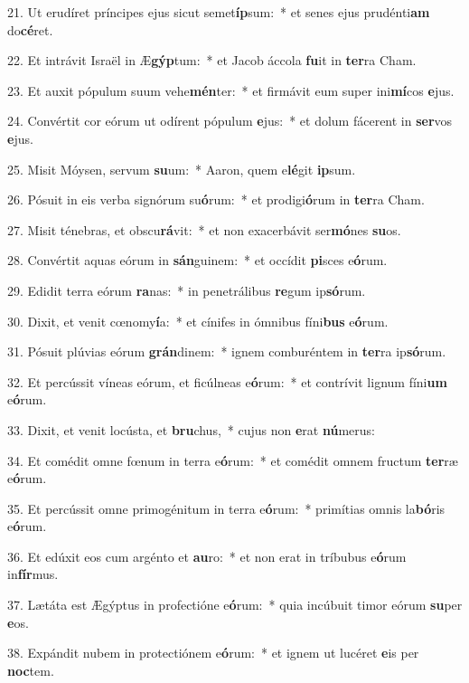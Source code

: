 21. Ut erudíret príncipes ejus sicut semet\textbf{íp}sum:~*  et senes ejus prudénti\textbf{am} do\textbf{cé}ret.\

22. Et intrávit Israël in Æ\textbf{gýp}tum:~*  et Jacob áccola \textbf{fu}it in \textbf{ter}ra Cham.\

23. Et auxit pópulum suum vehe\textbf{mén}ter:~*  et firmávit eum super ini\textbf{mí}cos \textbf{e}jus.\

24. Convértit cor eórum ut odírent pópulum \textbf{e}jus:~*  et dolum fácerent in \textbf{ser}vos \textbf{e}jus.\

25. Misit Móysen, servum \textbf{su}um:~*  Aaron, quem e\textbf{lé}git \textbf{ip}sum.\

26. Pósuit in eis verba signórum su\textbf{ó}rum:~*  et prodigi\textbf{ó}rum in \textbf{ter}ra Cham.\

27. Misit ténebras, et obscu\textbf{rá}vit:~*  et non exacerbávit ser\textbf{mó}nes \textbf{su}os.\

28. Convértit aquas eórum in \textbf{sán}guinem:~*  et occídit \textbf{pi}sces e\textbf{ó}rum.\

29. Edidit terra eórum \textbf{ra}nas:~*  in penetrálibus \textbf{re}gum ip\textbf{só}rum.\

30. Dixit, et venit cœnomy\textbf{í}a:~*  et cínifes in ómnibus fíni\textbf{bus} e\textbf{ó}rum.\

31. Pósuit plúvias eórum \textbf{grán}dinem:~*  ignem comburéntem in \textbf{ter}ra ip\textbf{só}rum.\

32. Et percússit víneas eórum, et ficúlneas e\textbf{ó}rum:~*  et contrívit lignum fíni\textbf{um} e\textbf{ó}rum.\

33. Dixit, et venit locústa, et \textbf{bru}chus,~*  cujus non \textbf{e}rat \textbf{nú}merus:\

34. Et comédit omne fœnum in terra e\textbf{ó}rum:~*  et comédit omnem fructum \textbf{ter}ræ e\textbf{ó}rum.\

35. Et percússit omne primogénitum in terra e\textbf{ó}rum:~*  primítias omnis la\textbf{bó}ris e\textbf{ó}rum.\

36. Et edúxit eos cum argénto et \textbf{au}ro:~*  et non erat in tríbubus e\textbf{ó}rum in\textbf{fír}mus.\

37. Lætáta est Ægýptus in profectióne e\textbf{ó}rum:~*  quia incúbuit timor eórum \textbf{su}per \textbf{e}os.\

38. Expándit nubem in protectiónem e\textbf{ó}rum:~*  et ignem ut lucéret \textbf{e}is per \textbf{noc}tem.\

